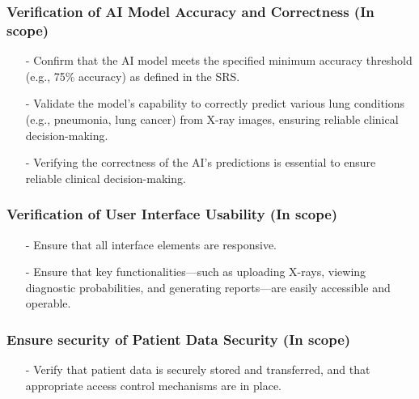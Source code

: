 \documentclass[12pt, titlepage]{article}
\begin{document}
    \subsubsection{Verification of AI Model Accuracy and Correctness (In scope)}
    \begin{itemize}
        \item[-] Confirm that the AI model meets the specified minimum accuracy threshold (e.g., 75\% accuracy) as defined in the SRS.
        \item[-] Validate the model's capability to correctly predict various lung conditions (e.g., pneumonia, lung cancer) from X-ray images, ensuring reliable clinical decision-making.
        \item[-] Verifying the correctness of the AI's predictions is essential to ensure reliable clinical decision-making.
    \end{itemize}
    
    \subsubsection{Verification of User Interface Usability (In scope)}
    \begin{itemize}
        \item[-] Ensure that all interface elements are responsive.
        \item[-] Ensure that key functionalities—such as uploading X-rays, viewing diagnostic probabilities, and generating reports—are easily accessible and operable.
        
        
    \end{itemize}
    
    \subsubsection{Ensure security of Patient Data Security (In scope)}
    \begin{itemize}
        \item[-] Verify that patient data is securely stored and transferred, and that appropriate access control mechanisms are in place.

    \end{itemize}
    
\end{document}
